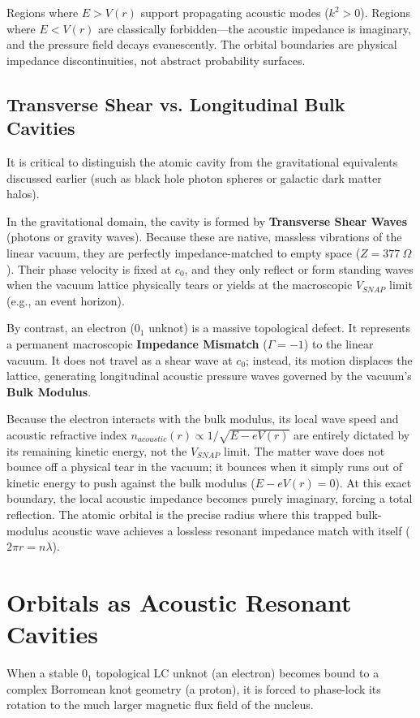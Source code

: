 Regions where $E > V(r)$ support propagating acoustic modes ($k^2 > 0$). Regions where $E < V(r)$ are classically forbidden---the acoustic impedance is imaginary, and the pressure field decays evanescently. The orbital boundaries are physical impedance discontinuities, not abstract probability surfaces.

\subsection{Transverse Shear vs. Longitudinal Bulk Cavities}
It is critical to distinguish the atomic cavity from the gravitational equivalents discussed earlier (such as black hole photon spheres or galactic dark matter halos). 

In the gravitational domain, the cavity is formed by \textbf{Transverse Shear Waves} (photons or gravity waves). Because these are native, massless vibrations of the linear vacuum, they are perfectly impedance-matched to empty space ($Z = 377 \ \Omega$). Their phase velocity is fixed at $c_0$, and they only reflect or form standing waves when the vacuum lattice physically tears or yields at the macroscopic $V_{SNAP}$ limit (e.g., an event horizon).

By contrast, an electron ($0_1$ unknot) is a massive topological defect. It represents a permanent macroscopic \textbf{Impedance Mismatch} ($\Gamma = -1$) to the linear vacuum. It does not travel as a shear wave at $c_0$; instead, its motion displaces the lattice, generating longitudinal acoustic pressure waves governed by the vacuum's \textbf{Bulk Modulus}.

Because the electron interacts with the bulk modulus, its local wave speed and acoustic refractive index $n_{acoustic}(r) \propto 1 / \sqrt{E - eV(r)}$ are entirely dictated by its remaining kinetic energy, not the $V_{SNAP}$ limit. The matter wave does not bounce off a physical tear in the vacuum; it bounces when it simply runs out of kinetic energy to push against the bulk modulus ($E - eV(r) = 0$). At this exact boundary, the local acoustic impedance becomes purely imaginary, forcing a total reflection. The atomic orbital is the precise radius where this trapped bulk-modulus acoustic wave achieves a lossless resonant impedance match with itself ($2\pi r = n \lambda$).

\section{Orbitals as Acoustic Resonant Cavities}
When a stable $0_1$ topological LC unknot (an electron) becomes bound to a complex Borromean knot geometry (a proton), it is forced to phase-lock its rotation to the much larger magnetic flux field of the nucleus. 

